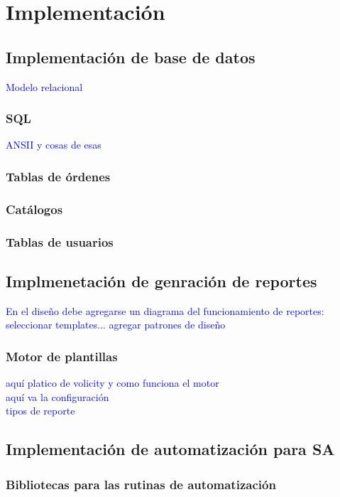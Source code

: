 \chapter{Implementación}\label{cap4}


\section{Implementación de base de datos}
\textcolor{blue}{Modelo relacional}\\
\subsection{SQL}
\textcolor{blue}{ANSII y cosas de esas}
\subsection{Tablas de órdenes}
\subsection{Catálogos}
\subsection{Tablas de usuarios}

\section{Implmenetación de genración de reportes}

\textcolor{blue}{En el diseño debe agregarse un diagrama del funcionamiento de reportes: seleccionar templates... agregar patrones de diseño}\\
\subsection{Motor de plantillas}
\textcolor{blue}{aquí platico de volicity y como funciona el motor}\\
\textcolor{blue}{aquí va la configuración}\\
\textcolor{blue}{tipos de reporte}

\section{Implementación de automatización para SA}
\subsection{Bibliotecas para las rutinas de automatización}
